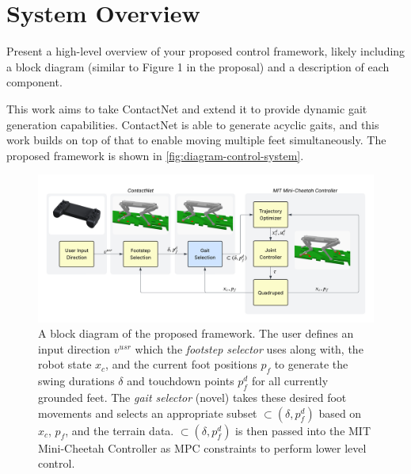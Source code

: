 \section{System Overview}

\begin{outline}
  Present a high-level overview of your proposed control framework, likely including a block diagram (similar to Figure 1 in the proposal) and a description of each component.
\end{outline}

This work aims to take ContactNet \cite{bratta_contactnet_2024} and extend it to provide dynamic gait generation capabilities. ContactNet is able to generate acyclic gaits, and this work builds on top of that to enable moving multiple feet simultaneously. The proposed framework is shown in \autoref{fig:diagram-control-system}.

\begin{figure}
  \centering
  \includegraphics[width=1.0\linewidth]{images/diagrams/control-system.png}
  \caption{A block diagram of the proposed framework. The user defines an input direction $v^{usr}$ which the \textit{footstep selector} \cite{bratta_contactnet_2024} uses along with, the robot state $x_c$, and the current foot positions $p_f$ to generate the swing durations $\delta$ and touchdown points $p_f^d$ for all currently grounded feet. The \textit{gait selector} (novel) takes these desired foot movements and selects an appropriate subset $\subset(\delta,p_f^d)$ based on $x_c$, $p_f$, and the terrain data. $\subset(\delta,p_f^d)$ is then passed into the MIT Mini-Cheetah Controller as MPC constraints to perform lower level control.}
  \label{fig:diagram-control-system}
\end{figure}
